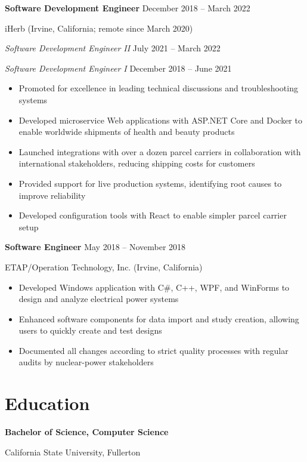 \documentclass[12pt]{article}
\newcommand{\titleheader}[2]{\textbf{#1} \symbol{"B7} #2}
\newcommand{\secondaryheader}[2]{\hspace{0.25in} \textit{#1} \symbol{"B7} #2}
\newcommand{\locheader}[2]{#1 (#2)}
\begin{document}
	\titleheader{Software Development Engineer}{December 2018 -- March 2022}

	\locheader{iHerb}{Irvine, California; remote since March 2020}

	\secondaryheader{Software Development Engineer II}{July 2021 -- March 2022}

	\secondaryheader{Software Development Engineer I}{December 2018 -- June 2021}

	\begin{itemize}
		\item Promoted for excellence in leading technical discussions and troubleshooting systems
		\item Developed microservice Web applications with ASP.NET Core and Docker to enable worldwide shipments of health and beauty products
		\item Launched integrations with over a dozen parcel carriers in collaboration with international stakeholders, reducing shipping costs for customers
		\item Provided support for live production systems, identifying root causes to improve reliability
		\item Developed configuration tools with React to enable simpler parcel carrier setup
	\end{itemize}

	\titleheader{Software Engineer}{May 2018 -- November 2018}

	\locheader{ETAP/Operation Technology, Inc.}{Irvine, California}

	\begin{itemize}
		\item Developed Windows application with C\#, C++, WPF, and WinForms to design and analyze electrical power systems
		\item Enhanced software components for data import and study creation, allowing users to quickly create and test designs
		\item Documented all changes according to strict quality processes with regular audits by nuclear-power stakeholders
	\end{itemize}

	\section*{Education}

	\textbf{Bachelor of Science, Computer Science}

	California State University, Fullerton
\end{document}
